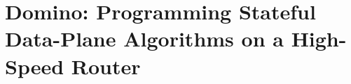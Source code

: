 \chapter{Domino: Programming Stateful Data-Plane Algorithms on a High-Speed Router}
\label{chap:domino}






